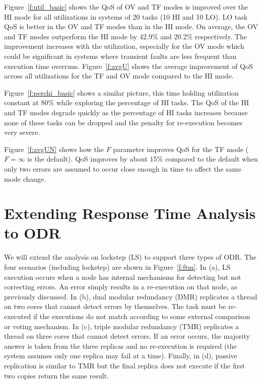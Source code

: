 
	Figure~\ref{f:util_basic} shows the QoS of OV and TF modes is improved over the HI mode for all utilizations in systems of 20 tasks (10 HI and 10 LO). LO task QoS is better in the OV and TF modes than in the HI mode. On average, the OV and TF modes outperform the HI mode by 42.9\% and 20.2\% respectively. The improvement increases with the utilization, especially for the OV mode which could be significant in systems where transient faults are less frequent than execution time overruns. Figure~\ref{f:avgU} shows the average improvement of QoS across all utilizations for the TF and OV mode compared to the HI mode.
	
	
	Figure~\ref{f:perchi_basic} shows a similar picture, this time holding utilization constant at 80\% while exploring the percentage of HI tasks. The QoS of the HI and TF modes degrade quickly as the percentage of HI tasks increases because none of these tasks can be dropped and the penalty for re-execution becomes very severe.
	 	
	Figure~\ref{f:avgUN} shows how the $F$ parameter improves QoS for the TF mode ($F=\infty$ is the default). QoS improves by about 15\% compared to the default when only two errors are assumed to occur close enough in time to affect the same mode change.

\section{Extending Response Time Analysis to ODR}
\label{s:multicorerta}
	We will extend the analysis on lockstep (LS) to support three types of ODR. The four scenarios (including lockstep) are shown in Figure~\ref{f:ftm}. 
	In (a), LS execution occurs when a node has internal mechanisms for detecting but not correcting errors. 
	An error simply results in a re-execution on that node, as previously discussed. 	
	In (b), dual modular redundancy (DMR) replicates a thread on two cores that cannot detect errors by themselves. 
	The task must be re-executed if the executions do not match according to some external comparison or voting mechanism.
	In (c), triple modular redundancy (TMR) replicates a thread on three cores that cannot detect errors. 
	If an error occurs, the majority answer is taken from the three replicas and no re-execution is required (the system assumes only one replica may fail at a time).
	Finally, in (d), passive replication is similar to TMR but the final replica does not execute if the first two copies return the same result. 


